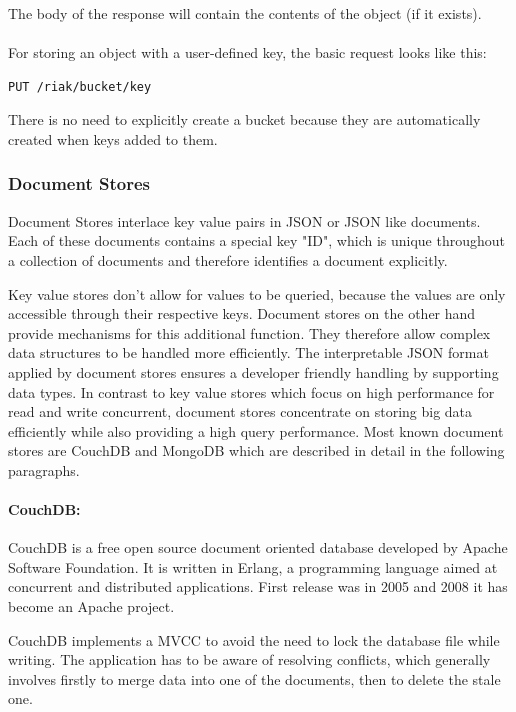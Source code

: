 The body of the response will contain the contents of the object (if it exists).
\\
\\
For storing an object with a user-defined key, the basic request looks like this:

\begin{code}
\begin{verbatim}
PUT /riak/bucket/key
\end{verbatim}
\label{lst:riak_get}
\end{code}

There is no need to explicitly create a bucket because they are automatically created when keys added to them.


\subsubsection{Document Stores}
Document Stores interlace key value pairs in \ac{JSON} or \ac{JSON} like documents. Each of these documents contains a special key "ID", which is unique throughout a collection of documents and therefore identifies a document explicitly. 

Key value stores don't allow for values to be queried, because the values are only accessible through their respective keys. Document stores on the other hand provide mechanisms for this additional function. They therefore allow complex data structures to be handled more efficiently. The interpretable \ac{JSON} format applied by document stores ensures a developer friendly handling by supporting data types. In contrast to key value stores which focus on high performance for read and write concurrent, document stores concentrate on storing big data efficiently while also providing a high query performance. Most known document stores are CouchDB and MongoDB  which are described in detail in the following paragraphs.

\paragraph{CouchDB:} CouchDB is a free open source document oriented database developed by Apache Software Foundation. It is written in Erlang, a programming language aimed at concurrent and distributed applications. First release was in 2005 and 2008 it has become an Apache project.

CouchDB implements a \ac{MVCC} to avoid the need to lock the database file while writing. The application has to be aware of resolving conflicts, which generally involves firstly to merge data into one of the documents, then to delete the stale one.

